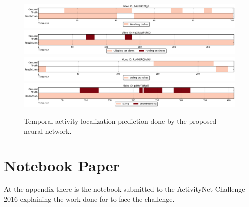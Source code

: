 \begin{figure}[H]
\begin{center}
\includegraphics[width=1\linewidth]{img/results/activity_detection/activity_temporal_localization_32}
\includegraphics[width=1\linewidth]{img/results/activity_detection/activity_temporal_localization_33}
\includegraphics[width=1\linewidth]{img/results/activity_detection/activity_temporal_localization_34}
\includegraphics[width=1\linewidth]{img/results/activity_detection/activity_temporal_localization_35}
\end{center}
\caption{Temporal activity localization prediction done by the proposed neural network.}
\label{fig:results_visualization_detection_annex_2}
\end{figure}

\chapter{Notebook Paper}

At the appendix there is the notebook submitted to the ActivityNet Challenge 2016 explaining the work done for to face the challenge.

